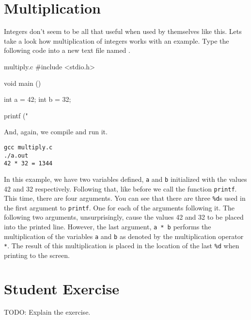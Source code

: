 \section{Multiplication}

Integers don't seem to be all that useful when used by themselves like this.
Lets take a look how multiplication of integers works with an example. Type
the following code into a new text file named .

\begin{code}{multiply.c}
#include <stdio.h>

void main ()
{
    int a = 42;
    int b = 32;

    printf ("%
}
\end{code}

And, again, we compile and run it.

\begin{Terminal}
\begin{Verbatim}
gcc multiply.c
./a.out
42 * 32 = 1344
\end{Verbatim}
\end{Terminal}

In this example, we have two variables defined, \verb|a| and \verb|b|
initialized with the values 42 and 32 respectively. Following that, like before
we call the function \verb|printf|. This time, there are four arguments. You can
see that there are three \verb|%d|s used in the first argument to \verb|printf|.
One for each of the arguments following it. The following two arguments,
unsurprisingly, cause the values 42 and 32 to be placed into the printed line.
However, the last argument, \verb|a * b| performs the multiplication of the
variables \verb|a| and \verb|b| as denoted by the multiplication operator
\verb|*|. The result of this multiplication is placed in the location of the
last \verb|%d| when printing to the screen.

\section{Student Exercise}

TODO: Explain the exercise.
